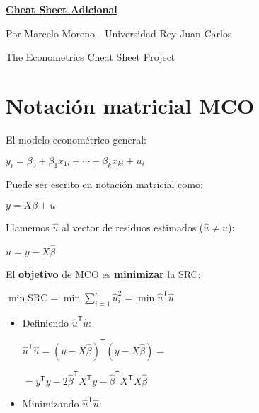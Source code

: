 \documentclass[10pt, a4paper, landscape]{article}
\newcommand{\SSR}{\mathrm{SRC}}
\newcommand{\tr}{\mathsf{T}}
\begin{document}
	\begin{multicols}{3}
		\begin{center}
			\textbf{\LARGE \href{https://github.com/marcelomijas/econometrics-cheatsheet}{Cheat Sheet Adicional}}
			
			{\footnotesize Por Marcelo Moreno - Universidad Rey Juan Carlos}
			
			{\footnotesize The Econometrics Cheat Sheet Project}
		\end{center}
		
		\section*{Notación matricial MCO}
		
		El modelo econométrico general:
		
		\begin{center}
			$y_{i} = \beta_{0} + \beta_{1} x_{1i} + \cdots + \beta_{k} x_{ki} + u_{i}$
		\end{center}
		
		Puede ser escrito en notación matricial como:
		
		\begin{center}
			$y = X \beta + u$
		\end{center}
		
		Llamemos $\hat{u}$ al vector de residuos estimados ($\hat{u} \neq u$):
		
		\begin{center}
			$\hat{u} = y - X \hat{\beta}$
		\end{center}
		
		El \textbf{objetivo} de MCO es \textbf{minimizar} la SRC:
		
		\begin{center}
			$\min \SSR = \min \sum_{i=1}^{n} \hat{u}_{i}^{2} = \min \hat{u}^{\tr} \hat{u}$
		\end{center}
		
		\begin{itemize}[leftmargin=*]
			\item Definiendo $\hat{u}^{\tr} \hat{u}$:
			
			\begin{center}
				$\hat{u}^{\tr} \hat{u} = (y - X \hat{\beta})^{\tr} (y - X \hat{\beta}) =$
				
				$= y^{\tr} y - 2 \hat{\beta}^{\tr} X^{\tr} y + \hat{\beta}^{\tr} X^{\tr} X \hat{\beta}$
			\end{center}
			
			\item Minimizando $\hat{u}^{\tr} \hat{u}$:
			

\end{itemize}
\end{multicols}
\end{document}
